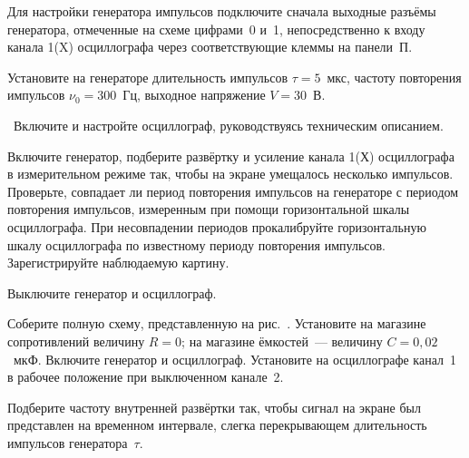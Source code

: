 \begin{lab:task}




\item Для настройки генератора импульсов подключите сначала выходные разъёмы генератора, 
отмеченные на схеме цифрами~0 и~1, непосредственно к входу канала 1(X) осциллографа 
через соответствующие клеммы на панели~П.

\item Установите на генераторе длительность импульсов $\tau=5$~мкс, частоту повторения 
импульсов $\nu_0=300$~Гц, выходное напряжение $V = 30$~В.

\item Включите и настройте осциллограф, руководствуясь техническим описанием.

\item Включите генератор, подберите развёртку и усиление канала 1(Х) осциллографа 
в измерительном режиме так, чтобы на экране умещалось несколько импульсов. Проверьте, 
совпадает ли период повторения импульсов на генераторе с периодом повторения импульсов, 
измеренным при помощи горизонтальной шкалы осциллографа. При несовпадении периодов 
прокалибруйте горизонтальную шкалу осциллографа по известному периоду повторения импульсов. 
Зарегистрируйте наблюдаемую картину. 

\item Выключите генератор и осциллограф.


\item Соберите полную схему, представленную на рис.~. 
Установите на магазине сопротивлений величину $R = 0$; на магазине ёмкостей~--- 
величину $C = 0,02$~мкФ. Включите генератор и осциллограф. Установите на 
осциллографе канал~1 в рабочее положение при выключенном канале~2. 

\item Подберите частоту внутренней развёртки так, чтобы сигнал на экране 
был представлен на временном интервале, слегка перекрывающем длительность 
импульсов генератора~$\tau$.


\end{lab:task}
